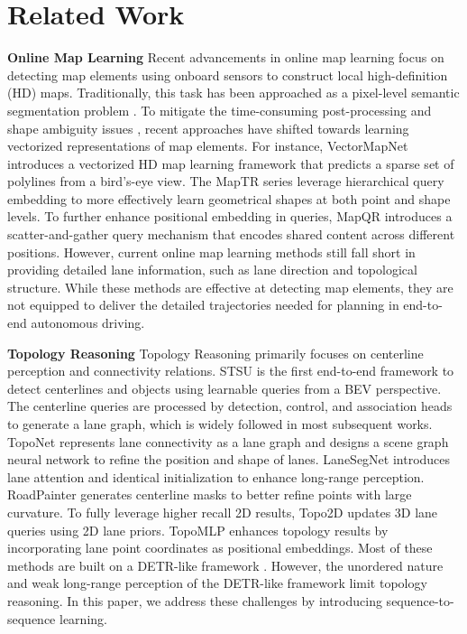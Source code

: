\section{Related Work}
\textbf{Online Map Learning}
Recent advancements in online map learning focus on detecting map elements using onboard sensors to construct local high-definition (HD) maps. Traditionally, this task has been approached as a pixel-level semantic segmentation problem \cite{liu2023petrv2,liu2023vision}. To mitigate the time-consuming post-processing and shape ambiguity issues \cite{li2022hdmapnet}, recent approaches have shifted towards learning vectorized representations of map elements. For instance, VectorMapNet \cite{liu2023vectormapnet} introduces a vectorized HD map learning framework that predicts a sparse set of polylines from a bird's-eye view. The MapTR series \cite{liao2022maptr,liao2023maptrv2} leverage hierarchical query embedding to more effectively learn geometrical shapes at both point and shape levels. To further enhance positional embedding in queries, MapQR \cite{liu2024leveraging} introduces a scatter-and-gather query mechanism that encodes shared content across different positions. However, current online map learning methods still fall short in providing detailed lane information, such as lane direction and topological structure. While these methods are effective at detecting map elements, they are not equipped to deliver the detailed trajectories needed for planning in end-to-end autonomous driving.



\textbf{Topology Reasoning}
Topology Reasoning primarily focuses on centerline perception and connectivity relations. STSU \cite{can2021structured} is the first end-to-end framework to detect centerlines and objects using learnable queries from a BEV perspective. The centerline queries are processed by detection, control, and association heads to generate a lane graph, which is widely followed in most subsequent works. TopoNet \cite{li2023graph} represents lane connectivity as a lane graph and designs a scene graph neural network to refine the position and shape of lanes. LaneSegNet \cite{li2023lanesegnet} introduces lane attention and identical initialization to enhance long-range perception. RoadPainter \cite{ma2024roadpainter} generates centerline masks to better refine points with large curvature. To fully leverage higher recall 2D results, Topo2D \cite{li2024enhancing} updates 3D lane queries using 2D lane priors. TopoMLP \cite{wu2023topomlp} enhances topology results by incorporating lane point coordinates as positional embeddings. Most of these methods are built on a DETR-like framework \cite{zhu2020deformable}. However, the unordered nature and weak long-range perception of the DETR-like framework limit topology reasoning. In this paper, we address these challenges by introducing sequence-to-sequence learning.



